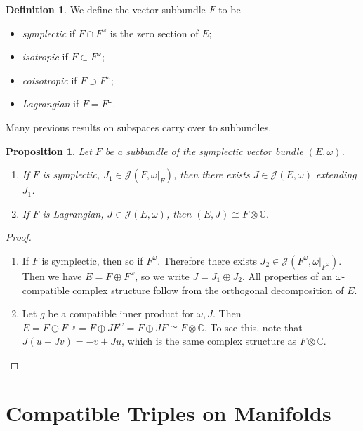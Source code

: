 \documentclass[leqno, openany]{memoir}
\newtheorem{prop}[thm]{Proposition}
\theoremstyle{definition}
\newtheorem{defn}[thm]{Definition}
\theoremstyle{remark}
\theoremstyle{plain}
\theoremstyle{definition}
\theoremstyle{remark}
\newcommand{\C}{\mathbb{C}}
\newcommand{\mc}[1]{\mathcal{#1}}
\begin{document}
\begin{defn} We define the vector subbundle $F$ to be \begin{itemize} \item
    \textit{symplectic} if $F \cap F^{\omega}$ is the zero section of $E$;
\item \textit{isotropic} if $F \subset F^{\omega}$; \item \textit{coisotropic}
    if $F \supset F^{\omega}$; \item \textit{Lagrangian} if $F = F^{\omega}$.
    \end{itemize} \end{defn} Many previous results on subspaces carry over to
    subbundles.

\begin{prop} Let $F$ be a subbundle of the symplectic vector bundle $(E,
    \omega)$.  \begin{enumerate} \item If $F$ is symplectic, $J_1 \in \mc{J}(F,
        \omega|_F)$, then there exists $J \in \mc{J}(E, \omega)$ extending
        $J_1$.  \item If $F$ is Lagrangian, $J \in \mc{J}(E, \omega)$, then
        $(E, J) \cong F \otimes \C$.  \end{enumerate} \end{prop}

\begin{proof} \begin{enumerate} \item If $F$ is symplectic, then so if
    $F^{\omega}$. Therefore there exists $J_2 \in \mc{J}(F^{\omega},
    \omega|_{F^{\omega}})$. Then we have $E = F \oplus F^{\omega}$, so we write
    $J = J_1 \oplus J_2$. All properties of an $\omega$-compatible complex
    structure follow from the orthogonal decomposition of $E$.  \item Let $g$
    be a compatible inner product for $\omega, J$. Then $E = F \oplus
    F^{\perp_g} = F \oplus JF^{\omega} = F \oplus JF \cong F \otimes \C$. To
    see this, note that $J(u + Jv) = -v + Ju$, which is the same complex
    structure as $F \otimes \C$. \qedhere \end{enumerate} \end{proof}

\section{Compatible Triples on Manifolds}%
\label{sec:compatible_triples_on_manifolds}
\end{document}
